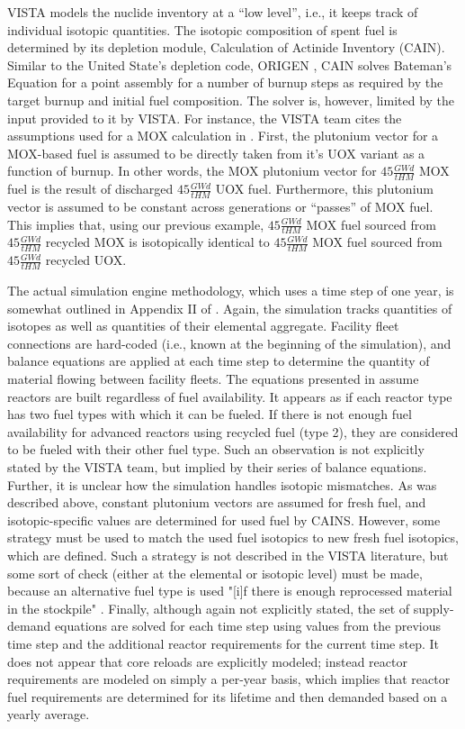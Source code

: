 VISTA models the nuclide inventory at a ``low level'', i.e., it keeps track of
individual isotopic quantities. The isotopic composition of spent fuel is
determined by its depletion module, Calculation of Actinide Inventory
(CAIN). Similar to the United State's depletion code, ORIGEN
\cite{bell_origen_1973}, CAIN solves Bateman's Equation for a point assembly for
a number of burnup steps as required by the target burnup and initial fuel
composition. The solver is, however, limited by the input provided to it by
VISTA. For instance, the VISTA team cites the assumptions used for a MOX
calculation in \cite{iaea_nuclear_2007}. First, the plutonium vector for a
MOX-based fuel is assumed to be directly taken from it's UOX variant as a
function of burnup. In other words, the MOX plutonium vector for $45 \frac{GW
  d}{tHM}$ MOX fuel is the result of discharged $45 \frac{GW d}{tHM}$ UOX
fuel. Furthermore, this plutonium vector is assumed to be constant across
generations or ``passes'' of MOX fuel. This implies that, using our previous
example, $45 \frac{GW d}{tHM}$ MOX fuel sourced from $45 \frac{GW d}{tHM}$
recycled MOX is isotopically identical to $45 \frac{GW d}{tHM}$ MOX fuel sourced
from $45 \frac{GW d}{tHM}$ recycled UOX.

The actual simulation engine methodology, which uses a time step of one year, is
somewhat outlined in Appendix II of \cite{iaea_nuclear_2007}. Again, the
simulation tracks quantities of isotopes as well as quantities of their
elemental aggregate. Facility fleet connections are hard-coded (i.e., known at
the beginning of the simulation), and balance equations are applied at each time
step to determine the quantity of material flowing between facility fleets. The
equations presented in \cite{iaea_nuclear_2007} assume reactors are built
regardless of fuel availability. It appears as if each reactor type has two fuel
types with which it can be fueled. If there is not enough fuel availability for
advanced reactors using recycled fuel (type 2), they are considered to be fueled
with their other fuel type. Such an observation is not explicitly stated by the
VISTA team, but implied by their series of balance equations. Further, it is
unclear how the simulation handles isotopic mismatches. As was described above,
constant plutonium vectors are assumed for fresh fuel, and isotopic-specific
values are determined for used fuel by CAINS. However, some strategy must be
used to match the used fuel isotopics to new fresh fuel isotopics, which are
defined. Such a strategy is not described in the VISTA literature, but some sort
of check (either at the elemental or isotopic level) must be made, because an
alternative fuel type is used "[i]f there is enough reprocessed material in the
stockpile" \cite{iaea_nuclear_2007}. Finally, although again not explicitly
stated, the set of supply-demand equations are solved for each time step using
values from the previous time step and the additional reactor requirements for
the current time step. It does not appear that core reloads are explicitly
modeled; instead reactor requirements are modeled on simply a per-year basis,
which implies that reactor fuel requirements are determined for its lifetime and
then demanded based on a yearly average.

